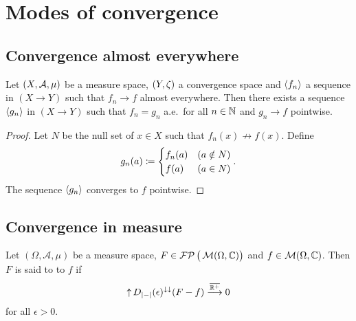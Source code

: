 \section{Modes of convergence}
\subsection{Convergence almost everywhere}
\begin{lemma} \label{AEconvergenceToPointwiseConvergence}
Let $\sSet{X,\mathcal{A},\mu}$ be a measure space, $\sSet{Y,\zeta}$ a convergence space and $\left\langle f_n \right\rangle$ a sequence in $(X\to Y)$ such that $f_n \to f$ almost everywhere. Then there exists a sequence $\left\langle g_n \right\rangle$ in $(X\to Y)$ such that $f_n = g_n$ a.e.\ for all $n\in \mathbb{N}$ and $g_n \to f$ pointwise.
\end{lemma}
\begin{proof}
Let $N$ be the null set of $x\in X$ such that $f_n(x) \not\to f(x)$. Define
\[ g_n(a) \coloneqq \begin{cases}
f_n(a) & (a\notin N) \\
f(a) & (a \in N)
\end{cases}. \]
The sequence $\left\langle g_n \right\rangle$ converges to $f$ pointwise.
\end{proof}


\subsection{Convergence in measure}
\begin{definition}
Let $(\Omega, \mathcal{A}, \mu)$ be a measure space, $F\in \operatorname{\mathcal{FP}}\big(\operatorname{\mathcal{M}}(\Omega, \mathbb{C})\big)$ and $f\in \operatorname{\mathcal{M}}(\Omega, \mathbb{C})$. Then $F$ is said to  to $f$ if
\[ \operatorname{\uparrow} D_{|-|}(\epsilon)^{\downarrow\downarrow}(F-f) \overset{\overline{\mathbb{R}^+}}{\longrightarrow} 0 \]
for all $\epsilon > 0$.
\end{definition}

